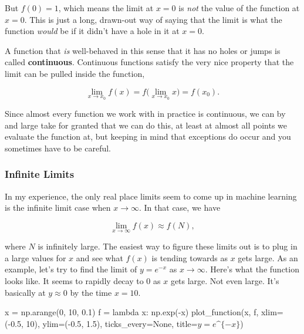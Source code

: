 \documentclass[
  letterpaper,
  DIV=11,
  numbers=noendperiod]{scrreprt}
\newenvironment{Shaded}{\begin{snugshade}}{\end{snugshade}}
\newcommand{\DecValTok}[1]{\textcolor[rgb]{0.68,0.00,0.00}{#1}}
\newcommand{\FloatTok}[1]{\textcolor[rgb]{0.68,0.00,0.00}{#1}}
\newcommand{\KeywordTok}[1]{\textcolor[rgb]{0.00,0.23,0.31}{#1}}
\newcommand{\NormalTok}[1]{\textcolor[rgb]{0.00,0.23,0.31}{#1}}
\newcommand{\OperatorTok}[1]{\textcolor[rgb]{0.37,0.37,0.37}{#1}}
\newcommand{\StringTok}[1]{\textcolor[rgb]{0.13,0.47,0.30}{#1}}
\newcommand{\VariableTok}[1]{\textcolor[rgb]{0.07,0.07,0.07}{#1}}
\begin{document}
But \(f(0) = 1\), which means the limit at \(x=0\) is \emph{not} the
value of the function at \(x=0\). This is just a long, drawn-out way of
saying that the limit is what the function \emph{would} be if it didn't
have a hole in it at \(x=0\).

A function that \emph{is} well-behaved in this sense that it has no
holes or jumps is called \textbf{continuous}. Continuous functions
satisfy the very nice property that the limit can be pulled inside the
function,

\[\lim_{x \rightarrow x_0} f(x) = f\bigg(\lim_{x \rightarrow x_0} x\bigg) = f(x_0).\]

Since almost every function we work with in practice is continuous, we
can by and large take for granted that we can do this, at least at
almost all points we evaluate the function at, but keeping in mind that
exceptions do occur and you sometimes have to be careful.

\hypertarget{infinite-limits}{%
\subsubsection{Infinite Limits}\label{infinite-limits}}

In my experience, the only real place limits seem to come up in machine
learning is the infinite limit case when \(x \rightarrow \infty\). In
that case, we have

\[\lim_{x \rightarrow \infty} f(x) \approx f(N),\]

where \(N\) is infinitely large. The easiest way to figure these limits
out is to plug in a large values for \(x\) and see what \(f(x)\) is
tending towards as \(x\) gets large. As an example, let's try to find
the limit of \(y=e^{-x}\) as \(x \rightarrow \infty\). Here's what the
function looks like. It seems to rapidly decay to \(0\) as \(x\) gets
large. Not even large. It's basically at \(y \approx 0\) by the time
\(x=10\).

\begin{Shaded}
\begin{Highlighting}[]
\NormalTok{x }\OperatorTok{=}\NormalTok{ np.arange(}\DecValTok{0}\NormalTok{, }\DecValTok{10}\NormalTok{, }\FloatTok{0.1}\NormalTok{)}
\NormalTok{f }\OperatorTok{=} \KeywordTok{lambda}\NormalTok{ x:  np.exp(}\OperatorTok{{-}}\NormalTok{x)}
\NormalTok{plot\_function(x, f, xlim}\OperatorTok{=}\NormalTok{(}\OperatorTok{{-}}\FloatTok{0.5}\NormalTok{, }\DecValTok{10}\NormalTok{), ylim}\OperatorTok{=}\NormalTok{(}\OperatorTok{{-}}\FloatTok{0.5}\NormalTok{, }\FloatTok{1.5}\NormalTok{), ticks\_every}\OperatorTok{=}\VariableTok{None}\NormalTok{, title}\OperatorTok{=}\StringTok{\textquotesingle{}$y=e\^{}\{{-}x\}$\textquotesingle{}}\NormalTok{)}
\end{Highlighting}
\end{Shaded}
\end{document}
